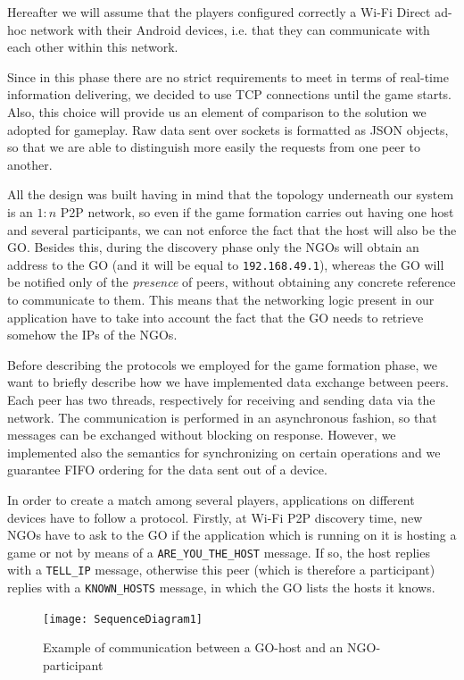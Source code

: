Hereafter we will assume that the players configured correctly a Wi-Fi Direct
ad-hoc network with their Android devices, i.e. that they can communicate with
each other within this network.

Since in this phase there are no strict requirements to meet in terms of
real-time information delivering, we decided to use TCP connections until the
game starts. Also, this choice will provide us an element of comparison to the
solution we adopted for gameplay.
Raw data sent over sockets is formatted as JSON objects, so that we are able to
distinguish more easily the requests from one peer to another.

All the design was built having in mind that the topology underneath our system
is an $1:n$ P2P network, so even if the game formation carries out having one
host and several participants, we can not enforce the fact that the host will
also be the GO. Besides this, during the discovery phase only the NGOs will
obtain an address to the GO (and it will be equal to \texttt{192.168.49.1}),
whereas the GO will be notified only of the \textit{presence} of peers, without
obtaining any concrete reference to communicate to them. This means that the
networking logic present in our application have to take into account the fact
that the GO needs to retrieve somehow the IPs of the NGOs.

Before describing the protocols we employed for the game formation phase, we
want to briefly describe how we have implemented data exchange between peers.
Each peer has two threads, respectively for receiving and sending data via the
network. The communication is performed in an asynchronous fashion, so that
messages can be exchanged without blocking on response. However, we implemented
also the semantics for synchronizing on certain operations and we guarantee FIFO
ordering for the data sent out of a device.

In order to create a match among several players, applications on different
devices have to follow a protocol. Firstly, at Wi-Fi P2P discovery time, new
NGOs have to ask to the GO if the application which is running on it is hosting
a game or not by means of a \texttt{ARE\_YOU\_THE\_HOST} message. If so, the
host replies with a \texttt{TELL\_IP} message, otherwise this peer (which is
therefore a participant) replies with a \texttt{KNOWN\_HOSTS} message, in which
the GO lists the hosts it knows.

\begin{figure}[h]
    \centering
    \texttt{[image: SequenceDiagram1]}
    \caption{Example of communication between a GO-host and an NGO-participant}
    \label{fig:seqDiagram1}
\end{figure}

